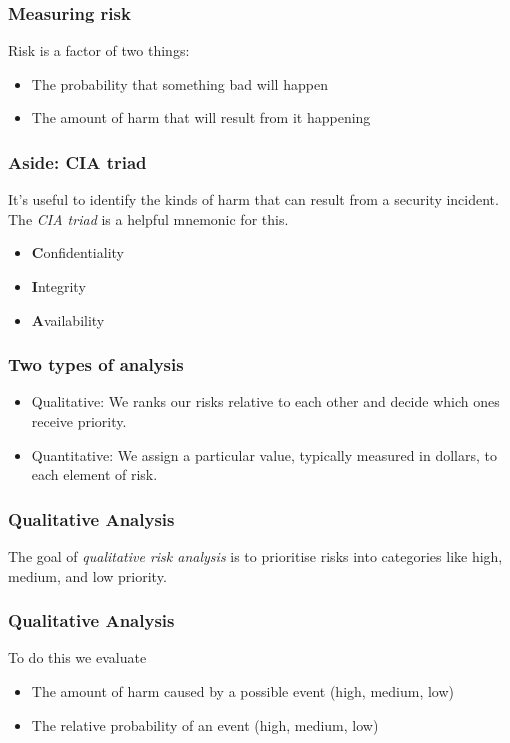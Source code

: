 \documentclass[10pt]{beamer}
\begin{document}
\begin{frame}
	\frametitle{Measuring risk}
	
	Risk is a factor of two things:
	\begin{itemize}
		\item The probability that something bad will happen
		\item The amount of harm that will result from it happening
	\end{itemize}
\end{frame}

\begin{frame}
	\frametitle{Aside: CIA triad}
	It's useful to identify the kinds of harm that can result from a security incident. 
	The \emph{CIA triad} is a helpful mnemonic for this.
	
	\begin{itemize}
		\item \textbf{C}onfidentiality
		\item \textbf{I}ntegrity
		\item \textbf{A}vailability
	\end{itemize}
\end{frame}

\begin{frame}
	\frametitle{Two types of analysis}
	
	\begin{itemize}
		\item Qualitative: We ranks our risks relative to each other and decide which ones receive priority.
		\item Quantitative: We assign a particular value, typically measured in dollars, to each element of risk.
	\end{itemize}
\end{frame}

\begin{frame}
	\frametitle{Qualitative Analysis}
	
	The goal of \emph{qualitative risk analysis} is to prioritise risks into categories like high, medium, and low priority.
\end{frame}

\begin{frame}
	\frametitle{Qualitative Analysis}
	
	To do this we evaluate
	
	\begin{itemize}
		\item The amount of harm caused by a possible event (high, medium, low)
		\item The relative probability of an event (high, medium, low)
	\end{itemize}
\end{frame}
	
\end{document}
